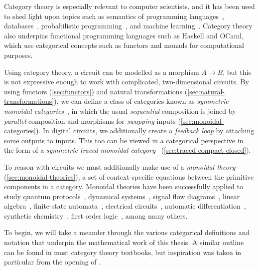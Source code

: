 Category theory is especially relevant to computer scientists, and it has been
used to shed light upon topics such as semantics of programming
languages~\cite{oles1982categorytheoretic}, databases~\cite{spivak2012functorial},
probabilistic programming~\cite{cho2019disintegration,fritz2020synthetic}, and
machine learning~\cite{fong2019backprop,cockett2020reverse}.
Category theory also underpins functional programming languages such as
Haskell and OCaml, which use categorical concepts such as functors and monads
for computational purposes.

Using category theory, a circuit can be modelled as a morphism \(A \to B\), but
this is not expressive enough to work with complicated, two-dimensional
circuits.
By using functors (\cref{sec:functors}) and natural transformations
(\cref{sec:natural-transformations}), we can define a class of categories known
as \emph{symmetric monoidal categories}~\cite{maclane1963natural}, in which the
usual \emph{sequential} composition is joined by \emph{parallel} composition
and morphisms for \emph{swapping} inputs (\cref{sec:monoidal-categories}).
In digital circuits, we additionally create a
\emph{feedback loop} by attaching some outputs to inputs.
This too can be viewed in a categorical perspective in the form of a
\emph{symmetric traced monoidal category}~\cite{joyal1996traced}
(\cref{sec:traced-compact-closed}).

To reason with circuits we must additionally make use of a
\emph{monoidal theory}
(\cref{sec:monoidal-theories}), a set of context-specific equations between
the primitive components in a category.
Monoidal theories have been successfully applied to study quantum
protocols~\cite{coecke2008interacting}, dynamical
systems~\cite{baez2015categories,fong2016categorical}, signal flow
diagrams~\cite{bonchi2014categorical,bonchi2015full,bonchi2017refinement,bonchi2021survey},
linear algebra~\cite{bonchi2017interacting,zanasi2015interacting,bonchi2019graphical,boisseau2022graphical},
finite-state automata~\cite{piedeleu2021string,piedeleu2022finite}, electrical
circuits~\cite{boisseau2022string}, automatic
differentiation~\cite{alvarez-picallo2023functorial}, synthetic
chemistry~\cite{gale2023categorical}, first order
logic~\cite{bonchi2024diagrammatic}, among many others.

To begin, we will take a meander through the various categorical definitions and
notation that underpin the mathematical work of this thesis.
A similar outline can be found in most category theory textbooks, but
inspiration was taken in particular from the opening of
\cite{ghica2023string}.








